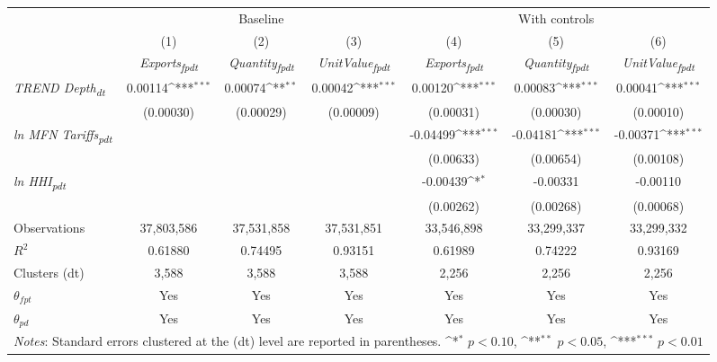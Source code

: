 {
\def\sym#1{\ifmmode^{#1}\else\(^{#1}\)\fi}
\begin{tabular}{l*{6}{c}}
\toprule
&\multicolumn{3}{c}{Baseline}&\multicolumn{3}{c}{With controls}\\\cmidrule(lr){2-4}\cmidrule(lr){5-7}
&(1)&(2)&(3)&(4)&(5)&(6)\\
&\textit{Exports\textsubscript{fpdt}}&\textit{Quantity\textsubscript{fpdt}}&\textit{UnitValue\textsubscript{fpdt}}&\textit{Exports\textsubscript{fpdt}}&\textit{Quantity\textsubscript{fpdt}}&\textit{UnitValue\textsubscript{fpdt}}\\
\midrule
\textit{TREND Depth\textsubscript{dt}} & 0.00114\sym{***} & 0.00074\sym{**} & 0.00042\sym{***} & 0.00120\sym{***} & 0.00083\sym{***} & 0.00041\sym{***}\\
 & (0.00030) & (0.00029) & (0.00009) & (0.00031) & (0.00030) & (0.00010)\\
\addlinespace
\textit{ln MFN Tariffs\textsubscript{pdt}} &  &  &  & -0.04499\sym{***} & -0.04181\sym{***} & -0.00371\sym{***}\\
 &  &  &  & (0.00633) & (0.00654) & (0.00108)\\
\addlinespace
\textit{ln HHI\textsubscript{pdt}} &  &  &  & -0.00439\sym{*} & -0.00331 & -0.00110\\
 &  &  &  & (0.00262) & (0.00268) & (0.00068)\\
\midrule
Observations & 37,803,586 & 37,531,858 & 37,531,851 & 33,546,898 & 33,299,337 & 33,299,332\\
$R^{2}$ & 0.61880 & 0.74495 & 0.93151 & 0.61989 & 0.74222 & 0.93169\\
Clusters (dt) & 3,588 & 3,588 & 3,588 & 2,256 & 2,256 & 2,256\\
$\theta_{fpt}$ & Yes & Yes & Yes & Yes & Yes & Yes\\
$\theta_{pd}$ & Yes & Yes & Yes & Yes & Yes & Yes\\
\bottomrule
\multicolumn{7}{l}{\footnotesize \textit{Notes}: Standard errors clustered at the (dt) level are reported in parentheses. \sym{*} \(p<0.10\), \sym{**} \(p<0.05\), \sym{***} \(p<0.01\)}\\
\end{tabular}
}
